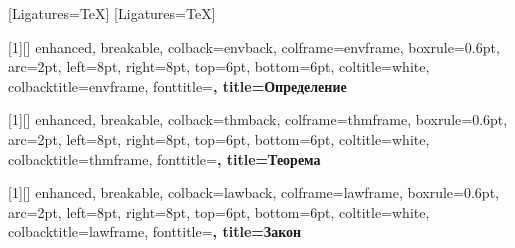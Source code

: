 \usepackage{fontspec}
\usepackage{polyglossia}
\setdefaultlanguage{russian}
\setmainfont{PT Serif}
\setsansfont{PT Sans}
\newfontfamily{}[Ligatures=TeX]
\newfontfamily{}[Ligatures=TeX]

\usepackage{amsmath}
\usepackage{amssymb}
\usepackage{physics}
\usepackage{geometry}
\geometry{a4paper, margin=2.2cm}
\usepackage{graphicx}
\usepackage{float}
\usepackage{longtable}
\usepackage{booktabs}
\usepackage{array}
\usepackage{calc}
\usepackage{etoolbox}
\usepackage[most]{tcolorbox}
\usepackage[hidelinks]{hyperref}

\providecommand{\tightlist}{\setlength{\itemsep}{0pt}\setlength{\parskip}{0pt}}
\providecommand{\pandocbounded}[1]{#1}


[1][]{%
  enhanced, breakable,
  colback=envback, colframe=envframe, boxrule=0.6pt, arc=2pt,
  left=8pt, right=8pt, top=6pt, bottom=6pt,
  coltitle=white, colbacktitle=envframe, fonttitle=\bfseries\small,
  title={Определение}}

[1][]{%
  enhanced, breakable,
  colback=thmback, colframe=thmframe, boxrule=0.6pt, arc=2pt,
  left=8pt, right=8pt, top=6pt, bottom=6pt,
  coltitle=white, colbacktitle=thmframe, fonttitle=\bfseries\small,
  title={Теорема}}

[1][]{%
  enhanced, breakable,
  colback=lawback, colframe=lawframe, boxrule=0.6pt, arc=2pt,
  left=8pt, right=8pt, top=6pt, bottom=6pt,
  coltitle=white, colbacktitle=lawframe, fonttitle=\bfseries\small,
  title={Закон}}


